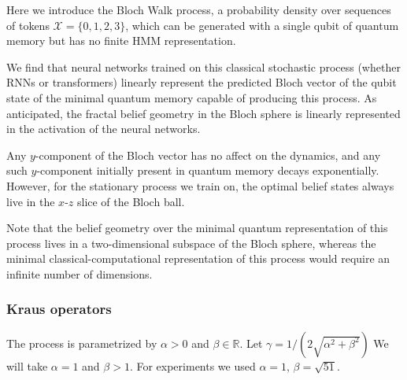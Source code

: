 \documentclass[prx,nofootinbib,onecolumn,showkeys,groupaddress,preprintnumbers,floatfix,
superscriptaddress]{revtex4-1}
\begin{document}

Here we introduce the Bloch Walk process, 
a probability density over sequences of tokens $\mathcal{X} = \{ 0,1,2,3\}$,
which can be generated with a single qubit of quantum memory but has no finite HMM representation.

We find that neural networks trained on this classical stochastic process
(whether RNNs or transformers)
linearly represent the predicted 
Bloch vector of the qubit %
state of the minimal quantum memory %
capable of producing this process.
As anticipated, the 
fractal belief geometry in the Bloch sphere is linearly represented in the activation of the neural networks.

Any $y$-component of the Bloch vector has no affect on the dynamics, and any such $y$-component initially present in quantum memory decays exponentially.
However, for the stationary process we train on, the optimal belief states always live in the $x$-$z$ slice of the Bloch ball.

Note that the belief geometry over the minimal quantum representation of this process
lives in a two-dimensional subspace of the Bloch sphere, whereas the minimal classical-computational representation of this process would require an infinite number of dimensions.


\subsubsection{Kraus operators}

The process is parametrized by $\alpha > 0$ and $\beta \in \mathbb{R}$.
Let $\gamma = 1/(2 \sqrt{\alpha^2 + \beta^2} )$
We will take $\alpha = 1$ and $\beta > 1$. For experiments we used $\alpha=1, \, \beta=\sqrt{51}$.
\end{document}
